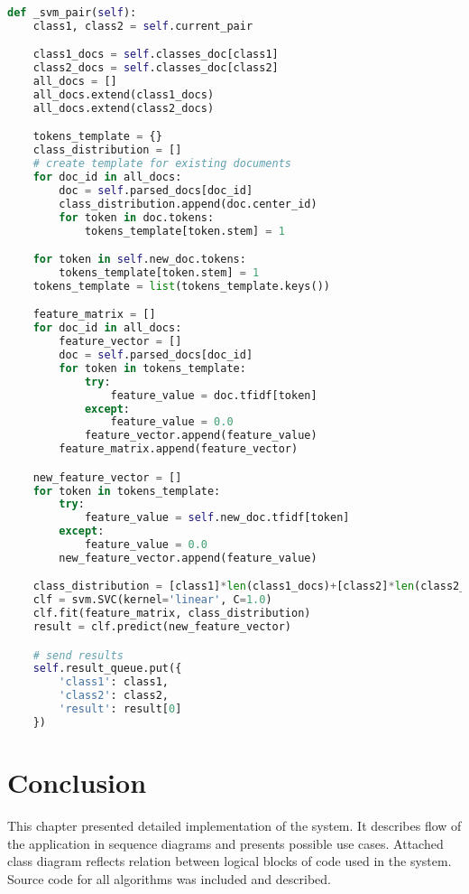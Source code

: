 \begin{lstlisting}[language=Python, caption={SVM.\_svm\_pair() - SVM class process main method}, label={lst:svm:svm}]
def _svm_pair(self):
    class1, class2 = self.current_pair

    class1_docs = self.classes_doc[class1]
    class2_docs = self.classes_doc[class2]
    all_docs = []
    all_docs.extend(class1_docs)
    all_docs.extend(class2_docs)

    tokens_template = {}
    class_distribution = []
    # create template for existing documents
    for doc_id in all_docs:
        doc = self.parsed_docs[doc_id]
        class_distribution.append(doc.center_id)
        for token in doc.tokens:
            tokens_template[token.stem] = 1

    for token in self.new_doc.tokens:
        tokens_template[token.stem] = 1
    tokens_template = list(tokens_template.keys())

    feature_matrix = []
    for doc_id in all_docs:
        feature_vector = []
        doc = self.parsed_docs[doc_id]
        for token in tokens_template:
            try:
                feature_value = doc.tfidf[token]
            except:
                feature_value = 0.0
            feature_vector.append(feature_value)
        feature_matrix.append(feature_vector)

    new_feature_vector = []
    for token in tokens_template:
        try:
            feature_value = self.new_doc.tfidf[token]
        except:
            feature_value = 0.0
        new_feature_vector.append(feature_value)

    class_distribution = [class1]*len(class1_docs)+[class2]*len(class2_docs)
    clf = svm.SVC(kernel='linear', C=1.0)
    clf.fit(feature_matrix, class_distribution)
    result = clf.predict(new_feature_vector)

    # send results
    self.result_queue.put({
        'class1': class1,
        'class2': class2,
        'result': result[0]
    })
\end{lstlisting}

\section{Conclusion}
This chapter presented detailed implementation of the system. It describes flow of the application in sequence diagrams and presents possible use cases. Attached class diagram reflects relation between logical blocks of code used in the system. Source code for all algorithms was included and described.
